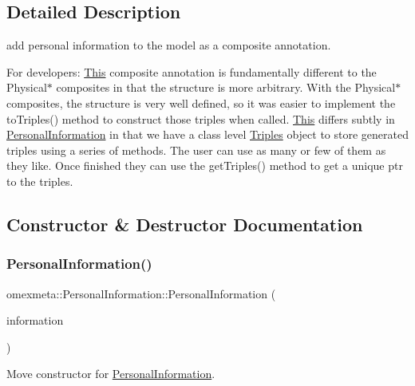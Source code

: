 \subsection{Detailed Description}
add personal information to the model as a composite annotation. 

For developers\+: \hyperlink{classThis}{This} composite annotation is fundamentally different to the Physical$\ast$ composites in that the structure is more arbitrary. With the Physical$\ast$ composites, the structure is very well defined, so it was easier to implement the to\+Triples() method to construct those triples when called. \hyperlink{classThis}{This} differs subtly in \hyperlink{classomexmeta_1_1PersonalInformation}{Personal\+Information} in that we have a class level \hyperlink{classomexmeta_1_1Triples}{Triples} object to store generated triples using a series of methods. The user can use as many or few of them as they like. Once finished they can use the get\+Triples() method to get a unique ptr to the triples. 

\subsection{Constructor \& Destructor Documentation}
\mbox{\label{classomexmeta_1_1PersonalInformation_a6653d6c5751154f5f33562d9879d6727}} 
\subsubsection{\texorpdfstring{Personal\+Information()}{PersonalInformation()}}
{\footnotesize\ttfamily omexmeta\+::\+Personal\+Information\+::\+Personal\+Information (\begin{DoxyParamCaption}\item[{\hyperlink{classomexmeta_1_1PersonalInformation}{Personal\+Information} \&\&}]{information }\end{DoxyParamCaption})\hspace{0.3cm}{\ttfamily [noexcept]}}



Move constructor for \hyperlink{classomexmeta_1_1PersonalInformation}{Personal\+Information}. 

